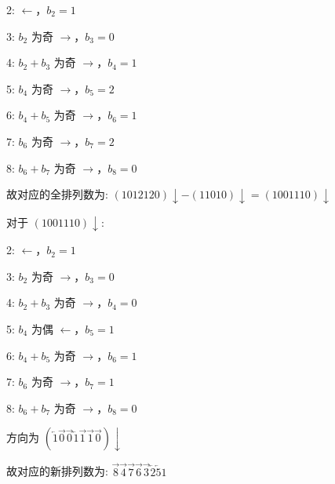 \documentclass[12pt]{article}
\begin{document}
\begin{CJK}{UTF8}{gbsn}
2: $\leftarrow$，$b_{2} = 1$

3: $b_{2}$ 为奇 $\rightarrow$，$b_{3} = 0$

4: $b_{2} + b_{3}$ 为奇 $\rightarrow$，$b_{4} = 1$

5: $b_{4}$ 为奇 $\rightarrow$，$b_{5} = 2$

6: $b_{4} + b_{5}$ 为奇 $\rightarrow$，$b_{6} = 1$

7: $b_{6}$ 为奇 $\rightarrow$，$b_{7} = 2$

8: $b_{6} + b_{7}$ 为奇 $\rightarrow$，$b_{8} = 0$

故对应的全排列数为: $(1012120)\downarrow - (11010)\downarrow = (1001110)\downarrow$

对于 $(1001110)\downarrow$:

2: $\leftarrow$，$b_{2} = 1$

3: $b_{2}$ 为奇 $\rightarrow$，$b_{3} = 0$

4: $b_{2} + b_{3}$ 为奇 $\rightarrow$，$b_{4} = 0$

5: $b_{4}$ 为偶 $\leftarrow$，$b_{5} = 1$

6: $b_{4} + b_{5}$ 为奇 $\rightarrow$，$b_{6} = 1$

7: $b_{6}$ 为奇 $\rightarrow$，$b_{7} = 1$

8: $b_{6} + b_{7}$ 为奇 $\rightarrow$，$b_{8} = 0$

方向为 $(\overleftarrow{1}\overrightarrow{0}\overrightarrow{0}\overleftarrow{1}\overrightarrow{1}\overrightarrow{1}\overrightarrow{0})\downarrow$

故对应的新排列数为: $\overrightarrow{8}\overrightarrow{4}\overrightarrow{7}\overrightarrow{6}\overrightarrow{3}\overleftarrow{2}\overleftarrow{5}1$

\vspace{10pt}


\end{CJK}
\end{document}
